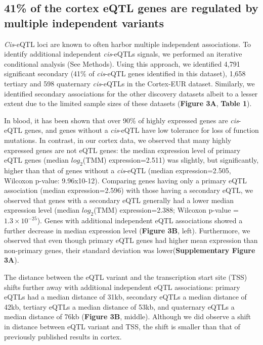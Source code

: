 \subsection{41\% of the cortex eQTL genes are regulated by multiple independent variants}
\emph{Cis}-eQTL loci are known to often harbor multiple independent associations\cite{aguetGeneticEffectsGene2017,zhernakovaIdentificationContextdependentExpression2017,vosaUnravelingPolygenicArchitecture2018}. To identify additional independent \emph{cis}-eQTLs signals, we performed an iterative conditional analysis (See Methods). Using this approach, we identified 4,791 significant secondary (41\% of \emph{cis}-eQTL genes identified in this dataset), 1,658 tertiary and 598 quaternary \emph{cis}-eQTLs in the Cortex-EUR dataset. Similarly, we identified secondary associations for the other discovery datasets albeit to a lesser extent due to the limited sample sizes of these datasets (\textbf{Figure 3A}, \textbf{Table 1}).  

In blood, it has been shown that over 90\% of highly expressed genes are \emph{cis}-eQTL genes, and genes without a \emph{cis}-eQTL have low tolerance for loss of function mutations\cite{vosaUnravelingPolygenicArchitecture2018}. In contrast, in our cortex data, we observed that many highly expressed genes are not eQTL genes: the median expression level of primary eQTL genes (median $log_2$(TMM) expression=2.511) was slightly, but significantly, higher than that of genes without a \emph{cis}-eQTL (median expression=2.505, Wilcoxon p-value: 9.96x10-12). Comparing genes having only a primary eQTL association (median expression=2.596) with those having a secondary eQTL, we observed that genes with a secondary eQTL generally had a lower median expression level (median $log_2$(TMM) expression=2.388; Wilcoxon p-value = $1.3 \times 10^{-25}$). Genes with additional independent eQTL associations showed a further decrease in median expression level (\textbf{Figure 3B}, left). Furthermore, we observed that even though primary eQTL genes had higher mean expression than non-primary genes, their standard deviation was lower(\textbf{Supplementary Figure 3A}). 

The distance between the eQTL variant and the transcription start site (TSS) shifts further away with additional independent eQTL associations: primary eQTLs had a median distance of 31kb, secondary eQTLs a median distance of 42kb, tertiary eQTLs a median distance of 53kb, and quaternary eQTLs a median distance of 76kb (\textbf{Figure 3B}, middle). Although we did observe a shift in distance between eQTL variant and TSS, the shift is smaller than that of previously published results in cortex\cite{dobbynLandscapeConditionalEQTL2018}.  

